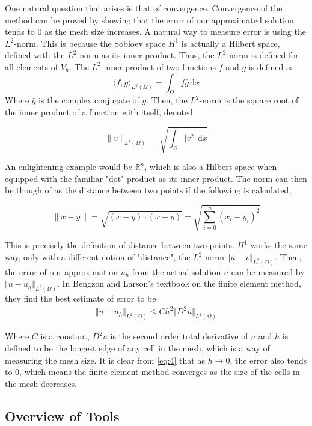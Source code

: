 One natural question that arises is that of convergence. Convergence of the method can be proved by showing that the error of our approximated solution tends to $0$ as the mesh size increases. A natural way to measure error is using the $L^2$-norm. This is because the Sobloev space $H^1$ is actually a Hilbert space, defined with the $L^2$-norm as its inner product. Thus, the $L^2$-norm is defined for all elements of $V_h$. The $L^2$ inner product of two functions $f$ and $g$ is defined as 
$$
\langle f, g \rangle_{L^2(\Omega)} = \int_{\Omega} f \bar{g} \, \mathrm{d}x
$$
Where $\bar{g}$ is the complex conjugate of $g$. Then, the $L^2$-norm is the square root of the inner product of a function with itself, denoted

$$
\lVert v \rVert_{L^2(\Omega)} = \sqrt{\int_{\Omega} \lvert v^2 \rvert \, \mathrm{d}x} 
$$

An enlightening example would be $\mathbb{R}^n$, which is also a Hilbert space when equipped with the familiar "dot" product as its inner product. The norm can then be though of as the distance between two points if the following is calculated,

$$\lVert x - y \rVert = \sqrt{(x-y) \cdot (x-y)} = \sqrt{\sum_{i=0}^n (x_i-y_i)^2}$$

This is precisely the definition of distance between two points. $H^1$ works the same way, only with a different notion of "distance", the $L^2$-norm $\Vert u - v \Vert_{L^2(\Omega)}$. Then, the error of our approximation $u_h$ from the actual solution $u$ can be measured by $\Vert u - u_h \Vert_{L^2(\Omega)}$.
In Bengzon and Larson's textbook on the finite element method\cite{bengzon-larson-fem}, they find the best estimate of error to be 
\begin{align}
\Vert u - u_h \Vert_{L^2(\Omega)} \leq Ch^2\Vert D^2 u \Vert_{L^2(\Omega)} \label{eq:4}
\end{align}

Where $C$ is a constant, $D^2u$ is the second order total derivative of $u$ and $h$ is defined to be the longest edge of any cell in the mesh, which is a way of measuring the mesh size. It is clear from \ref{eq:4} that as $h \rightarrow 0$, the error also tends to $0$, which means the finite element method converges as the size of the cells in the mesh decreases.

\subsection{Overview of Tools} \label{subsection:overview-of-tools}

